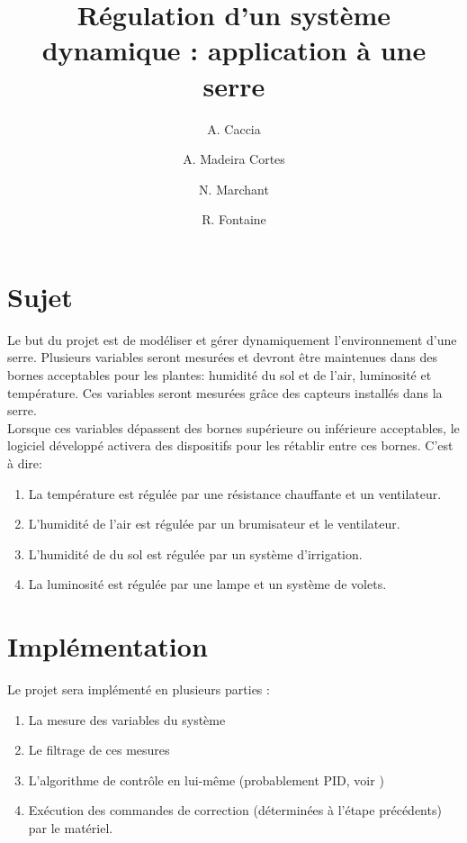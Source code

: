 \documentclass[a4paper,10pt]{article}
\title{Régulation d'un système dynamique : application à une serre}
\author{A. Caccia \and A. Madeira Cortes \and N. Marchant \and R. Fontaine}
\date{ }
\begin{document}
\maketitle

\vspace{1cm}

\section{Sujet}

Le but du projet est de modéliser et gérer dynamiquement l'environnement d'une serre. Plusieurs variables seront mesurées et devront être maintenues dans des bornes acceptables pour les plantes: humidité du sol et de l'air, luminosité et température. Ces variables seront mesurées grâce des capteurs installés dans la serre. \\

Lorsque ces variables dépassent des bornes supérieure ou inférieure acceptables, le logiciel développé activera des dispositifs pour les rétablir entre ces bornes. C'est à dire: \\

\begin{enumerate}
	\item La température est régulée par une résistance chauffante et un ventilateur.
	\item L'humidité de l'air est régulée par un brumisateur et le ventilateur.
	\item L'humidité de du sol est régulée par un système d'irrigation.
	\item La luminosité est régulée par une lampe et un système de volets.\\
\end{enumerate}

\newpage

\section{Implémentation}

Le projet sera implémenté en plusieurs parties :

\begin{enumerate}
    \item La mesure des variables du système
    \item Le filtrage de ces mesures
    \item L'algorithme de contrôle en lui-même (probablement PID, voir \cite{Kinnaert2013})
    \item Exécution des commandes de correction (déterminées à l'étape précédents) par le matériel.
\end{enumerate}
\end{document}
